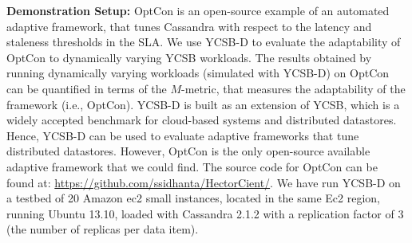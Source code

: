 \documentclass[conference]{IEEEtran}
\begin{document}
 \par \textbf{Demonstration  Setup:}
 OptCon \cite{OptCOnCCGRid2016} is an open-source example of an automated adaptive framework, that tunes Cassandra with respect to the latency and staleness thresholds in the SLA.
 We use YCSB-D to evaluate the adaptability of OptCon to dynamically varying YCSB workloads. The results obtained by running
 dynamically varying workloads (simulated with YCSB-D) on OptCon can be quantified in terms of the $M$-metric, that measures the adaptability of the framework (i.e., OptCon). YCSB-D is built as an extension of YCSB, which is a widely accepted
 benchmark for cloud-based systems and distributed datastores. Hence, YCSB-D can be used to evaluate adaptive
 frameworks that tune distributed datastores. However, OptCon is the only open-source available adaptive framework that we could find.   %
 The source code  for OptCon can be found at: \url{https://github.com/ssidhanta/HectorCient/}.
 We have run  YCSB-D on a testbed of 20 Amazon ec2 small
instances, located in the same Ec2 region, running Ubuntu 13.10, loaded with Cassandra 2.1.2 %
 with a replication factor of 3 (the number of replicas per data item).
\end{document}
